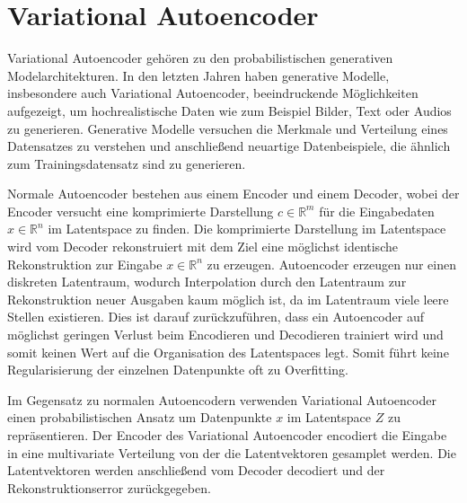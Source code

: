 \section{Variational Autoencoder}\raggedbottom
Variational Autoencoder \citep{kingma2014autoencoding} gehören zu den probabilistischen generativen Modelarchitekturen. In den letzten Jahren haben generative Modelle, insbesondere auch Variational Autoencoder, beeindruckende Möglichkeiten aufgezeigt, um hochrealistische Daten wie zum Beispiel Bilder, Text oder Audios zu generieren.
Generative Modelle versuchen die Merkmale und Verteilung eines Datensatzes zu verstehen und anschließend neuartige Datenbeispiele, die ähnlich zum Trainingsdatensatz sind zu generieren.

Normale Autoencoder bestehen aus einem Encoder und einem Decoder, wobei der Encoder versucht eine komprimierte Darstellung $c \in \mathbb{R}^{m}$ für die Eingabedaten $x \in \mathbb{R}^{n}$ im Latentspace zu finden. Die komprimierte Darstellung im Latentspace wird vom Decoder rekonstruiert mit dem Ziel eine möglichst identische Rekonstruktion zur Eingabe $x \in \mathbb{R}^{n}$ zu erzeugen.
Autoencoder erzeugen nur einen diskreten Latentraum, wodurch Interpolation durch den Latentraum zur Rekonstruktion neuer Ausgaben kaum möglich ist, da im Latentraum viele leere Stellen existieren. 
Dies ist darauf zurückzuführen, dass ein Autoencoder auf möglichst geringen Verlust beim Encodieren und Decodieren trainiert wird und somit keinen Wert auf die Organisation des Latentspaces legt. 
Somit führt keine Regularisierung der einzelnen Datenpunkte oft zu Overfitting.

Im Gegensatz zu normalen Autoencodern verwenden Variational Autoencoder einen probabilistischen Ansatz um Datenpunkte $x$ im Latentspace $Z$ zu repräsentieren. 
Der Encoder des Variational Autoencoder encodiert die Eingabe in eine multivariate Verteilung von der die Latentvektoren gesamplet werden. 
Die Latentvektoren werden anschließend vom Decoder decodiert und der Rekonstruktionserror zurückgegeben.

